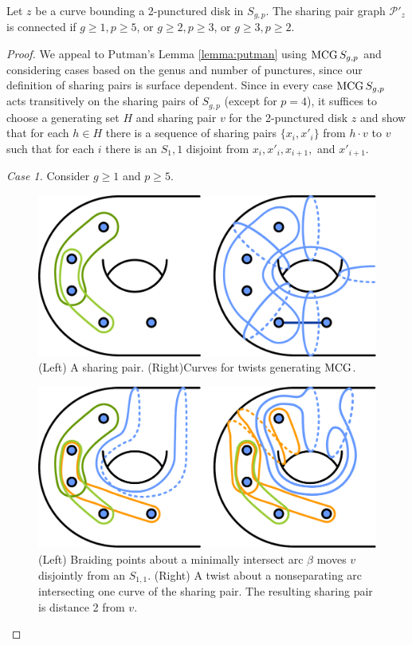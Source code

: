 \begin{lemma}
  Let $z$ be a curve bounding a 2-punctured disk in $S_{g,p}$.
  The sharing pair graph $\mathcal P'_z$
  is connected if $g\geq 1, p\geq 5$, or $g\geq2, p\geq 3$, or $g\geq3, p\geq 2$.
  \label{lemma:cogenussharepair}
\end{lemma}

\begin{proof}
  We appeal to Putman's Lemma \ref{lemma:putman} using $\operatorname{MCG} S_{g,p}$ and
  considering cases based on the genus and number of punctures,
  since our definition of sharing pairs is surface dependent.
  Since in every case $\operatorname{MCG} S_{g,p}$
  acts transitively on the sharing pairs of $S_{g,p}$ (except for $p=4$),
  it suffices to choose a generating set $H$ and sharing pair $v$ for the 2-punctured disk $z$
  and show that
  for each $h \in H$ there is a sequence of sharing pairs $\{x_i,x'_i\}$
  from $h\cdot v$ to $v$ such that for each $i$ there is an $S_1,1$
  disjoint from $x_{i},x'_i,x_{i+1},$ and $x'_{i+1}$.

  \emph{Case 1.} Consider $g\geq 1$ and $p\geq 5$.

  \begin{figure}[h!]
    \centering
    \includegraphics[width=.5\textwidth]{figures/handlecompliment.pdf}
    \caption{(Left) A sharing pair. (Right)Curves for twists  generating $\operatorname{MCG}$.}
    \label{fig:csshandlecomp1}
  \end{figure}

  \begin{figure}[h!]
    \centering
    \includegraphics[width=.5\textwidth]{figures/handlecompliments1b.pdf}
    \caption{(Left) Braiding points about a minimally intersect arc $\beta$ moves $v$ disjointly from an $S_{1,1}$.
    (Right) A twist about a nonseparating arc intersecting one curve of the sharing pair.
    The resulting sharing pair is distance 2 from $v$.}
    \label{fig:csshandlecomp1b}
  \end{figure}


\end{proof}
